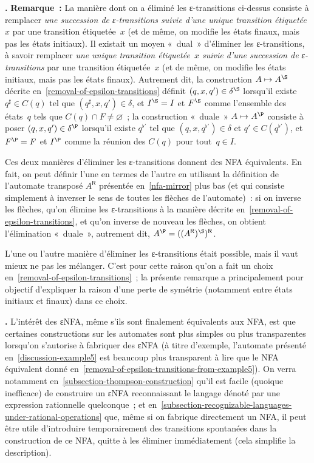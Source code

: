 \documentclass[12pt,a4paper]{article}
\theoremstyle{definition}
\newcommand\thingy{%
\refstepcounter{comcnt}\medskip\noindent\textbf{\thecomcnt.} }
\begin{document}
{\footnotesize

\thingy\textbf{Remarque :} La manière dont on a éliminé les
ε-transitions ci-dessus consiste à remplacer \emph{une succession de
  ε-transitions suivie d'une unique transition étiquetée $x$} par une
transition étiquetée $x$ (et de même, on modifie les états finaux,
mais pas les états initiaux).  Il existait un moyen « dual »
d'éliminer les ε-transitions, à savoir remplacer \emph{une unique
  transition étiquetée $x$ suivie d'une succession de ε-transitions}
par une transition étiquetée $x$ (et de même, on modifie les états
initiaux, mais pas les états finaux).  Autrement dit, la construction
$A \mapsto A^\S$ décrite en \ref{removal-of-epsilon-transitions}
définit $(q,x,q') \in \delta^\S$ lorsqu'il existe $q^\sharp \in C(q)$
tel que $(q^\sharp,x,q') \in \delta$, et $I^\S=I$ et $F^\S$ comme
l'ensemble des états $q$ tels que $C(q) \cap F \neq \varnothing$ ; la
construction « duale » $A \mapsto A^\P$ consiste à poser $(q,x,q') \in
\delta^\P$ lorsqu'il existe $q^{\flat\prime}$ tel que
$(q,x,q^{\flat\prime}) \in \delta$ et $q' \in C(q^{\flat\prime})$, et
$F^\P=F$ et $I^\P$ comme la réunion des $C(q)$ pour tout $q\in I$.

Ces deux manières d'éliminer les ε-transitions donnent des NFA
équivalents.  En fait, on peut définir l'une en termes de l'autre en
utilisant la définition de l'automate transposé $A^{\mathsf{R}}$
présentée en \ref{nfa-mirror} plus bas (et qui consiste simplement à
inverser le sens de toutes les flèches de l'automate) : si on inverse
les flèches, qu'on élimine les ε-transitions à la manière décrite
en \ref{removal-of-epsilon-transitions}, et qu'on inverse de nouveau
les flèches, on obtient l'élimination « duale », autrement dit, $A^\P
= ((A^{\mathsf{R}})^\S)^{\mathsf{R}}$.

L'une ou l'autre manière d'éliminer les ε-transitions était possible,
mais il vaut mieux ne pas les mélanger.  C'est pour cette raison qu'on
a fait un choix en \ref{removal-of-epsilon-transitions} ; la présente
remarque a principalement pour objectif d'expliquer la raison d'une
perte de symétrie (notamment entre états initiaux et finaux) dans ce
choix.

\par}

\thingy L'intérêt des εNFA, même s'ils sont finalement équivalents aux
NFA, est que certaines constructions sur les automates sont plus
simples ou plus transparentes lorsqu'on s'autorise à fabriquer des
εNFA (à titre d'exemple, l'automate présenté
en \ref{discussion-example5} est beaucoup plus transparent à lire que
le NFA équivalent donné
en \ref{removal-of-epsilon-transitions-from-example5}).  On verra
notamment en \ref{subsection-thompson-construction} qu'il est facile
(quoique inefficace) de construire un εNFA reconnaissant le langage
dénoté par une expression rationnelle quelconque ; et
en \ref{subsection-recognizable-languages-under-rational-operations}
que, même si on fabrique directement un NFA, il peut être utile
d'introduire temporairement des transitions spontanées dans la
construction de ce NFA, quitte à les éliminer immédiatement (cela
simplifie la description).
\end{document}
